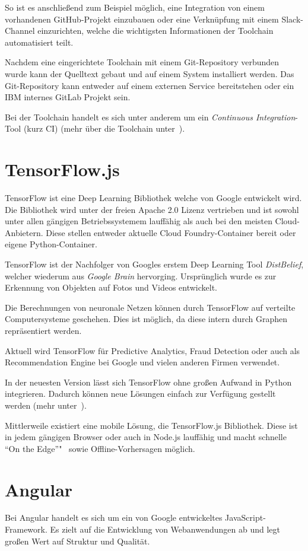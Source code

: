 So ist es anschließend zum Beispiel möglich, eine Integration von einem vorhandenen GitHub-Projekt einzubauen oder eine
Verknüpfung mit einem Slack-Channel einzurichten, welche die wichtigsten Informationen der Toolchain automatisiert teilt.

Nachdem eine eingerichtete Toolchain mit einem Git-Repository verbunden wurde kann der Quelltext gebaut und auf einem
System installiert werden. Das Git-Repository kann entweder auf einem externen Service bereitstehen oder ein IBM internes
GitLab Projekt sein.

Bei der Toolchain handelt es sich unter anderem um ein \textit{Continuous Integration}-Tool (kurz CI)
(mehr über die Toolchain unter~\cite{online_grundlagen_toolchain}).

\section{TensorFlow.js}
TensorFlow ist eine Deep Learning Bibliothek welche von Google entwickelt wird. Die Bibliothek wird unter der freien
Apache 2.0 Lizenz vertrieben und ist sowohl unter allen gängigen Betriebssystemem lauffähig als auch bei den meisten
Cloud-Anbietern. Diese stellen entweder aktuelle Cloud Foundry-Container bereit oder eigene Python-Container.

TensorFlow ist der Nachfolger von Googles erstem Deep Learning Tool \textit{DistBelief}, welcher wiederum aus
\textit{Google Brain} hervorging. Ursprünglich wurde es zur Erkennung von Objekten auf Fotos und Videos entwickelt.

Die Berechnungen von neuronale Netzen können durch TensorFlow auf verteilte Computersysteme geschehen. Dies ist möglich,
da diese intern durch Graphen repräsentiert werden.

Aktuell wird TensorFlow für Predictive Analytics, Fraud Detection oder auch als Recommendation Engine bei Google und
vielen anderen Firmen verwendet.

In der neuesten Version lässt sich TensorFlow ohne großen Aufwand in Python integrieren. Dadurch können neue Lösungen
einfach zur Verfügung gestellt werden (mehr unter~\cite{book_grundlagen_tensorflow}).

Mittlerweile existiert eine mobile Lösung, die TensorFlow.js Bibliothek. Diese ist in jedem gängigen Browser oder auch
in Node.js lauffähig und macht schnelle \enquote{On the Edge}"~ sowie Offline-Vorhersagen möglich.

\section{Angular}
Bei Angular handelt es sich um ein von Google entwickeltes JavaScript-Framework. Es zielt auf die Entwicklung von
Webanwendungen ab und legt großen Wert auf Struktur und Qualität.

